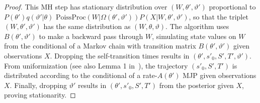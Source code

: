 \begin{proof}
This MH step has stationary distribution over $(W,\theta',\vartheta')$ proportional to
$P(\theta')q(\vartheta'|\theta)$ $\text{PoissProc}(W|\Omega(\theta',\vartheta'))
P(X|W,\theta',\vartheta')$, so that the triplet $(W,\theta', \vartheta')$ has the same distribution as $(W,\theta, \vartheta)$.
The algorithm uses $B(\theta',\vartheta')$ to make a backward pass through $W$, simulating state values on $W$ from the conditional of a Markov chain with transition matrix $B(\theta',\vartheta')$ given observations $X$. 
Dropping the self-transition times results in $(\theta', s'_0, S', T', \vartheta')$. 
From uniformization (see also Lemma 1 in~\cite{RaoTeh13}), the trajectory $(s'_0, S', T')$ is distributed according to the conditional of a rate-$A(\theta')$ MJP given observations $X$.
Finally, dropping $\vartheta'$ 
results in $(\theta',s'_0,S',T')$ from the posterior given $X$, proving stationarity.

\end{proof}

